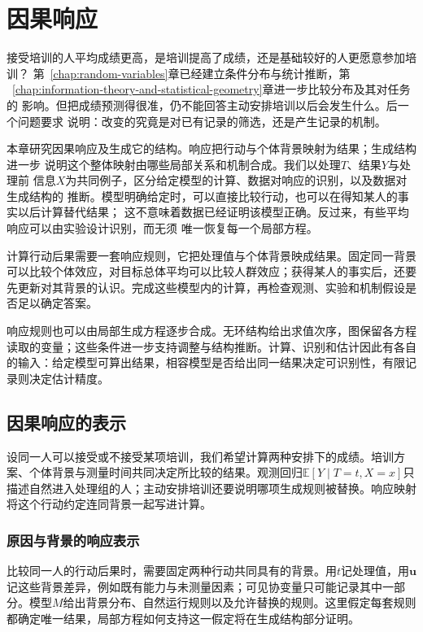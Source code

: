 \chapter{因果响应}
\label{chap:causal-inference}

接受培训的人平均成绩更高，是培训提高了成绩，还是基础较好的人更愿意参加培训？
第~\ref{chap:random-variables}章已经建立条件分布与统计推断，第
~\ref{chap:information-theory-and-statistical-geometry}章进一步比较分布及其对任务的
影响。但把成绩预测得很准，仍不能回答主动安排培训以后会发生什么。后一个问题要求
说明：改变的究竟是对已有记录的筛选，还是产生记录的机制。

本章研究因果响应及生成它的结构。响应把行动与个体背景映射为结果；生成结构进一步
说明这个整体映射由哪些局部关系和机制合成。我们以处理\(T\)、结果\(Y\)与处理前
信息\(X\)为共同例子，区分给定模型的计算、数据对响应的识别，以及数据对生成结构的
推断。模型明确给定时，可以直接比较行动，也可以在得知某人的事实以后计算替代结果；
这不意味着数据已经证明该模型正确。反过来，有些平均响应可以由实验设计识别，而无须
唯一恢复每一个局部方程。

计算行动后果需要一套响应规则，它把处理值与个体背景映成结果。固定同一背景可以比较个体效应，对目标总体平均可以比较人群效应；获得某人的事实后，还要先更新对其背景的认识。完成这些模型内的计算，再检查观测、实验和机制假设是否足以确定答案。

响应规则也可以由局部生成方程逐步合成。无环结构给出求值次序，图保留各方程读取的变量；这些条件进一步支持调整与结构推断。计算、识别和估计因此有各自的输入：给定模型可算出结果，相容模型是否给出同一结果决定可识别性，有限记录则决定估计精度。

\section{因果响应的表示}
\label{sec:causal-response-representation}

设同一人可以接受或不接受某项培训，我们希望计算两种安排下的成绩。培训方案、个体背景与测量时间共同决定所比较的结果。观测回归\(\mathbb E[Y\mid T=t,X=x]\)只描述自然进入处理组的人；主动安排培训还要说明哪项生成规则被替换。响应映射将这个行动约定连同背景一起写进计算。

\subsection{原因与背景的响应表示}
\label{sec:causal-observation-generation}

比较同一人的行动后果时，需要固定两种行动共同具有的背景。用\(t\)记处理值，用\(\bm u\)记这些背景差异，例如既有能力与未测量因素；可见协变量只可能记录其中一部分。模型\(M\)给出背景分布、自然运行规则以及允许替换的规则。这里假定每套规则都确定唯一结果，局部方程如何支持这一假定将在生成结构部分证明。

